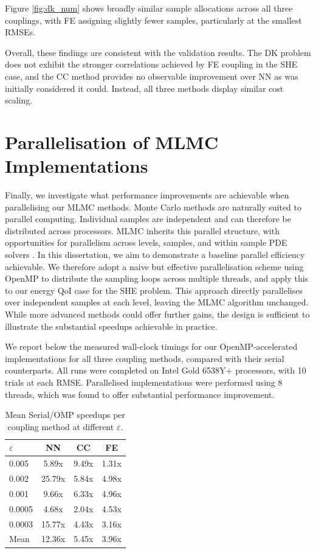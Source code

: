 Figure \ref{fig:dk_num} shows broadly 
similar sample allocations across all three couplings, with 
FE assigning slightly fewer samples, 
particularly at the smallest RMSEs.


Overall, these findings are consistent with the validation results. 
The DK problem 
does not exhibit the stronger 
correlations achieved by FE coupling in the SHE case, and 
the CC method provides no observable improvement 
over NN as was initially considered it could. 
Instead, all three methods display similar cost scaling.

\section{Parallelisation of MLMC Implementations}

Finally, we investigate what performance improvements are achievable 
when parallelising our MLMC methods. Monte Carlo methods are naturally 
suited to parallel computing. Individual samples are 
independent and can therefore be distributed 
across processors. MLMC 
inherits this parallel structure, with 
opportunities for parallelism across levels, samples, and 
within sample PDE solvers \cite{drzisga2017scheduling}.
In this dissertation, we aim to demonstrate 
a baseline parallel efficiency achievable. 
We therefore adopt a naive but effective parallelisation 
scheme using OpenMP to 
distribute the sampling loops across 
multiple threads, and apply this to our 
energy QoI case for the SHE problem. 
This approach directly parallelises over 
independent samples at each level, 
leaving the MLMC algorithm unchanged. While more 
advanced methods could offer further gains, the design is 
sufficient to illustrate the substantial speedups achievable
in practice. 

We report below the measured wall-clock timings for our 
OpenMP-accelerated implementations for all three coupling 
methods, compared with their serial counterparts. 
All runs were completed on Intel Gold 6538Y+ processors, with 10 trials 
at each RMSE. Parallelised implementations were performed using 8 threads, which
was found to offer substantial performance improvement.

\begin{table}[htbp]
    \centering
    \begin{tabular}{lccc}
        \hline
        $\varepsilon$ & NN & CC & FE \\
        \hline
        0.005 & 5.89x & 9.49x & 1.31x \\
        0.002 & 25.79x & 5.84x & 4.98x \\
        0.001 & 9.66x & 6.33x & 4.96x \\
        0.0005 & 4.68x & 2.04x & 4.53x \\
        0.0003 & 15.77x & 4.43x & 3.16x \\
        \hline 
        Mean & 12.36x & 5.45x & 3.96x \\
        \hline
    \end{tabular}
    \caption{Mean Serial/OMP speedups per coupling method at different $\varepsilon$.}
    \label{tab:omp_speedups}
\end{table}

